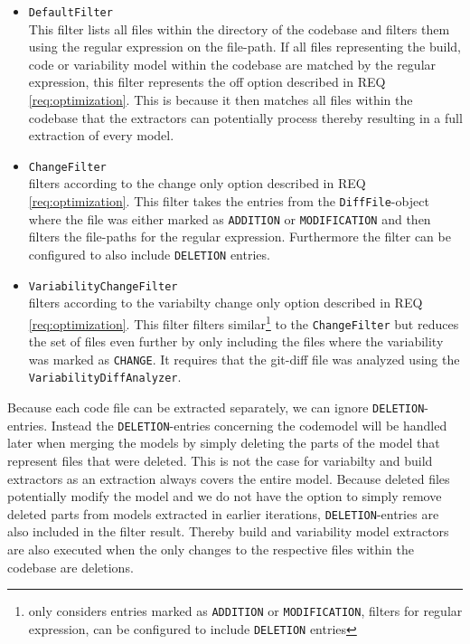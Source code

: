 \documentclass[a4paper]{article}
\begin{document}
\begin{itemize}
\item \texttt{DefaultFilter} \\
    This filter lists all files within the directory of the codebase and filters them using the regular expression on the file-path. If all files representing the build, code or variability model within the codebase are matched by the regular expression, this filter represents the off option described in REQ \ref{req:optimization}. This is because it then matches all files within the codebase that the extractors can potentially process thereby resulting in a full extraction of every model.
\item \texttt{ChangeFilter} \\
    filters according to the change only option described in REQ \ref{req:optimization}. This filter takes the entries from the \texttt{DiffFile}-object where the file was either marked as \texttt{ADDITION} or \texttt{MODIFICATION} and then filters the file-paths for the regular expression. Furthermore the filter can be configured to also include \texttt{DELETION} entries.
\item \texttt{VariabilityChangeFilter} \\
    filters according to the variabilty change only option described in REQ \ref{req:optimization}. This filter filters similar\footnote{only considers entries marked as \texttt{ADDITION} or \texttt{MODIFICATION}, filters for regular expression, can be configured to include \texttt{DELETION} entries} to the \texttt{ChangeFilter}  but reduces the set of files even further by only including the files where the variability was marked as \texttt{CHANGE}. It requires that the git-diff file was analyzed using the \texttt{VariabilityDiffAnalyzer}.
\end{itemize}

Because each code file can be extracted separately, we can ignore \texttt{DELETION}-entries. Instead the \texttt{DELETION}-entries concerning the codemodel will be handled later when merging the models by simply deleting the parts of the model that represent files that were deleted. This is not the case for variabilty and build extractors as an extraction always covers the entire model. Because deleted files potentially modify the model and we do not have the option to simply remove deleted parts from models extracted in earlier iterations, \texttt{DELETION}-entries are also included in the filter result. Thereby  build and variability model extractors are also executed when the only changes to the respective files within the codebase are deletions.
\end{document}
